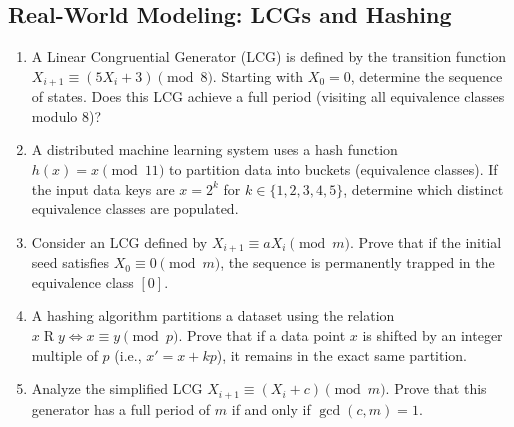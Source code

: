 \documentclass[11pt, a4paper]{article}
\theoremstyle{definition}
\theoremstyle{remark}
\begin{document}
\subsection{Real-World Modeling: LCGs and Hashing}
\begin{enumerate}[label=\textbf{\arabic*.}, resume]
    \item A Linear Congruential Generator (LCG) is defined by the transition function $X_{i+1} \equiv (5X_i + 3) \pmod{8}$. Starting with $X_0 = 0$, determine the sequence of states. Does this LCG achieve a full period (visiting all equivalence classes modulo 8)?
    \item A distributed machine learning system uses a hash function $h(x) = x \pmod{11}$ to partition data into buckets (equivalence classes). If the input data keys are $x = 2^k$ for $k \in \{1, 2, 3, 4, 5\}$, determine which distinct equivalence classes are populated.
    \item Consider an LCG defined by $X_{i+1} \equiv a X_i \pmod{m}$. Prove that if the initial seed satisfies $X_0 \equiv 0 \pmod{m}$, the sequence is permanently trapped in the equivalence class $[0]$.
    \item A hashing algorithm partitions a dataset using the relation $x \mathrel{R} y \iff x \equiv y \pmod{p}$. Prove that if a data point $x$ is shifted by an integer multiple of $p$ (i.e., $x' = x + kp$), it remains in the exact same partition.
    \item Analyze the simplified LCG $X_{i+1} \equiv (X_i + c) \pmod{m}$. Prove that this generator has a full period of $m$ if and only if $\gcd(c,m) = 1$.
\end{enumerate}
\end{document}
